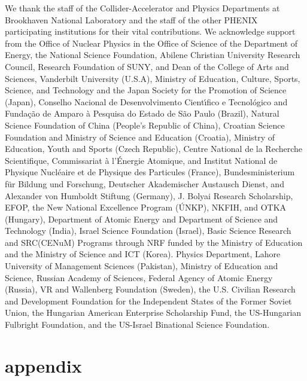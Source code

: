 \documentclass[twocolumn,letterpaper,aps,prc,longbibliography,superscriptaddress,nofootinbib,floatfix]{revtex4-1}
\begin{document}


\begin{acknowledgments}

We thank the staff of the Collider-Accelerator and Physics
Departments at Brookhaven National Laboratory and the staff of
the other PHENIX participating institutions for their vital
contributions.  We acknowledge support from the
Office of Nuclear Physics in the
Office of Science of the Department of Energy,
the National Science Foundation,
Abilene Christian University Research Council,
Research Foundation of SUNY, and
Dean of the College of Arts and Sciences, Vanderbilt University
(U.S.A),
Ministry of Education, Culture, Sports, Science, and Technology
and the Japan Society for the Promotion of Science (Japan),
Conselho Nacional de Desenvolvimento Cient\'{\i}fico e
Tecnol{\'o}gico and Funda\c c{\~a}o de Amparo {\`a} Pesquisa do
Estado de S{\~a}o Paulo (Brazil),
Natural Science Foundation of China (People's Republic of China),
Croatian Science Foundation and
Ministry of Science and Education (Croatia),
Ministry of Education, Youth and Sports (Czech Republic),
Centre National de la Recherche Scientifique, Commissariat
{\`a} l'{\'E}nergie Atomique, and Institut National de Physique
Nucl{\'e}aire et de Physique des Particules (France),
Bundesministerium f\"ur Bildung und Forschung, Deutscher Akademischer
Austausch Dienst, and Alexander von Humboldt Stiftung (Germany),
J. Bolyai Research Scholarship, EFOP, the New National Excellence
Program ({\'U}NKP), NKFIH, and OTKA (Hungary),
Department of Atomic Energy and Department of Science and Technology
(India),
Israel Science Foundation (Israel),
Basic Science Research and SRC(CENuM) Programs through NRF
funded by the Ministry of Education and the Ministry of
Science and ICT (Korea).
Physics Department, Lahore University of Management Sciences (Pakistan),
Ministry of Education and Science, Russian Academy of Sciences,
Federal Agency of Atomic Energy (Russia),
VR and Wallenberg Foundation (Sweden),
the U.S. Civilian Research and Development Foundation for the
Independent States of the Former Soviet Union,
the Hungarian American Enterprise Scholarship Fund,
the US-Hungarian Fulbright Foundation,
and the US-Israel Binational Science Foundation.

\end{acknowledgments}

\clearpage

\section*{appendix}
\end{document}
